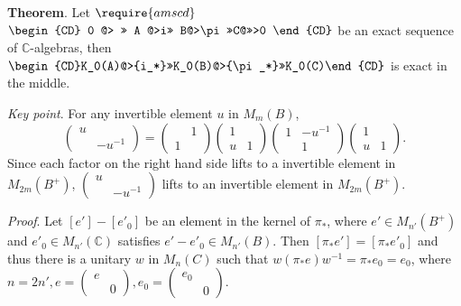 \documentclass[
]{article}
\author{}
\date{}
\begin{document}
{
\setcounter{tocdepth}{3}
\tableofcontents
}
\textbf{Theorem}. Let \(\require{amscd}\)
\(\begin{CD} 0 @> >> A @>i>> B@>\pi>>C@>>>0 \end{CD}\) be an exact
sequence of \(\mathbb{C}\)-algebras, then
\(\begin{CD}K_0(A)@>{i_*}>>K_0(B)@>{\pi_*}>>K_0(C)\end{CD}\) is exact in
the middle.

\emph{Key point}. For any invertible element \(u\) in \(M_m(B)\),
\[\begin{pmatrix}u & \\ & -u^{-1}\end{pmatrix}=\begin{pmatrix}& 1 \\ 1& \end{pmatrix}\begin{pmatrix}1 & \\u & 1\end{pmatrix}\begin{pmatrix}1 & -u^{-1}\\ & 1\end{pmatrix}\begin{pmatrix}1 & \\u & 1\end{pmatrix}.\]
Since each factor on the right hand side lifts to a invertible element
in \(M_{2m}(B^+)\), \(\begin{pmatrix}u & \\ & -u^{-1}\end{pmatrix}\)
lifts to an invertible element in \(M_{2m}(B^+)\).

\emph{Proof}. Let \([e']-[e'_0]\) be an element in the kernel of
\(\pi_*\), where \(e'\in M_{n'}(B^+)\) and
\(e'_0\in M_{n'}(\mathbb{C})\) satisfies \(e'- e'_0\in M_{n'}(B)\). Then
\([\pi_* e']=[\pi_* e'_0]\) and thus there is a unitary \(w\) in
\(M_{n}(C)\) such that \(w (\pi_* e) w^{-1}=\pi_* e_0=e_0\), where
\(n=2n', e= \begin{pmatrix}e & \\ & 0\end{pmatrix}, e_0=\begin{pmatrix}e_0 & \\ & 0\end{pmatrix}.\)
\end{document}

